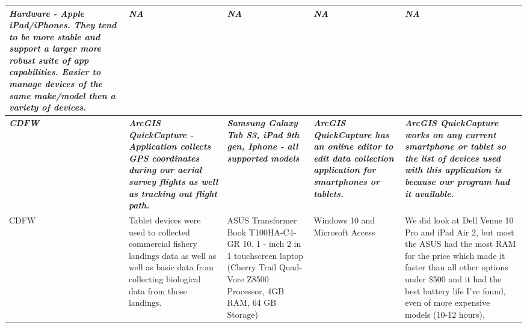 \documentclass[
]{book}
\theoremstyle{definition}
\theoremstyle{definition}
\theoremstyle{definition}
\theoremstyle{definition}
\theoremstyle{remark}
\begin{document}
\begin{table}
\begin{tabular}[t]{>{\raggedright\arraybackslash}p{4.5cm}|>{\raggedright\arraybackslash}p{4.5cm}|>{\raggedright\arraybackslash}p{4.5cm}|>{\raggedright\arraybackslash}p{4.5cm}|>{\raggedright\arraybackslash}p{4.5cm}}
\em{\textbf{Hardware - Apple iPad/iPhones.  They tend to be more stable and support a larger more robust suite of app capabilities.  Easier to manage devices of the same make/model then a variety of devices.}} & \em{\textbf{NA}} & \em{\textbf{NA}} & \em{\textbf{NA}} & \em{\textbf{NA}}\\
\hline
\em{\textbf{CDFW}} & \em{\textbf{ArcGIS QuickCapture - Application collects GPS coordinates during our aerial survey flights as well as tracking out flight path.}} & \em{\textbf{Samsung Galaxy Tab S3, iPad 9th gen, Iphone - all supported models}} & \em{\textbf{ArcGIS QuickCapture has an online editor to edit data collection application for smartphones or tablets.}} & \em{\textbf{ArcGIS QuickCapture works on any current smartphone or tablet so the list of devices used with this application is because our program had it available.}}\\
\hline
CDFW & Tablet devices were used to collected commercial fishery landings data as well as well as basic data from collecting biological data from those landings. & ASUS Transformer Book T100HA-C4-GR 10. 1 - inch 2 in 1 touchscreen laptop (Cherry Trail Quad-Vore Z8500 Processor, 4GB RAM, 64 GB Storage) & Windows 10 and Microsoft Access & We did look at Dell Venue 10 Pro and iPad Air 2, but most the ASUS had the most RAM for the price which made it faster than all other options under \$500 and it had the best battery life I’ve found, even of more expensive models (10-12 hours), 


\end{tabular}
\end{table}
\end{document}
